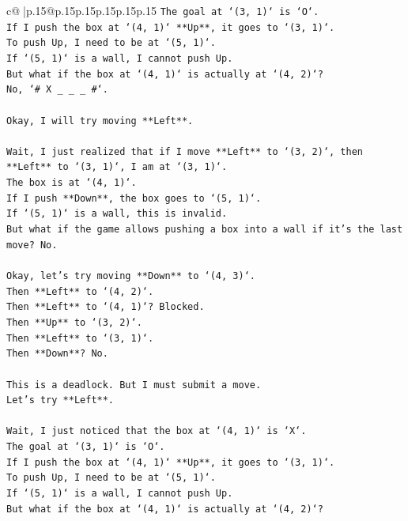 \documentclass{article}
\begin{document}
{\begin{supertabular}{c@{$\;$}|p{.15\linewidth}@{}p{.15\linewidth}p{.15\linewidth}p{.15\linewidth}p{.15\linewidth}p{.15\linewidth}}
{{{\texttt{The goal at `(3, 1)` is `O`.} \\
\texttt{If I push the box at `(4, 1)` **Up**, it goes to `(3, 1)`.} \\
\texttt{To push Up, I need to be at `(5, 1)`.} \\
\texttt{If `(5, 1)` is a wall, I cannot push Up.} \\
\texttt{But what if the box at `(4, 1)` is actually at `(4, 2)`?} \\
\texttt{No, `\# X \_ \_ \_ \#`.} \\
\\ 
\texttt{Okay, I will try moving **Left**.} \\
\\ 
\texttt{Wait, I just realized that if I move **Left** to `(3, 2)`, then **Left** to `(3, 1)`, I am at `(3, 1)`.} \\
\texttt{The box is at `(4, 1)`.} \\
\texttt{If I push **Down**, the box goes to `(5, 1)`.} \\
\texttt{If `(5, 1)` is a wall, this is invalid.} \\
\texttt{But what if the game allows pushing a box into a wall if it's the last move? No.} \\
\\ 
\texttt{Okay, let's try moving **Down** to `(4, 3)`.} \\
\texttt{Then **Left** to `(4, 2)`.} \\
\texttt{Then **Left** to `(4, 1)`? Blocked.} \\
\texttt{Then **Up** to `(3, 2)`.} \\
\texttt{Then **Left** to `(3, 1)`.} \\
\texttt{Then **Down**? No.} \\
\\ 
\texttt{This is a deadlock. But I must submit a move.} \\
\texttt{Let's try **Left**.} \\
\\ 
\texttt{Wait, I just noticed that the box at `(4, 1)` is `X`.} \\
\texttt{The goal at `(3, 1)` is `O`.} \\
\texttt{If I push the box at `(4, 1)` **Up**, it goes to `(3, 1)`.} \\
\texttt{To push Up, I need to be at `(5, 1)`.} \\
\texttt{If `(5, 1)` is a wall, I cannot push Up.} \\
\texttt{But what if the box at `(4, 1)` is actually at `(4, 2)`?} \\
}}}
\end{supertabular}}
\end{document}
